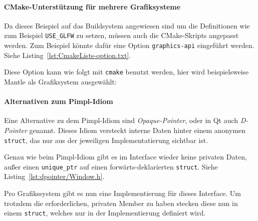 \documentclass[12pt, a4paper, titlepage, hidelinks]{scrreprt}
\begin{document}
\paragraph{CMake-Unterstützung für mehrere Grafiksysteme}
Da dieses Beispiel auf das Buildsystem angewiesen sind um die Definitionen wie zum Beispiel \texttt{USE\_GLFW} zu setzen, müssen auch die CMake-Skripts angepasst werden. Zum Beispiel könnte dafür eine Option \texttt{graphics-api} eingeführt werden. Siehe Listing~\autoref{lst:CmakeLists-option.txt}.


Diese Option kann wie folgt mit \texttt{cmake} benutzt werden, hier wird beispielsweise Mantle als Grafiksystem ausgewählt:

\paragraph{Alternativen zum Pimpl-Idiom}
Eine Alternative zu dem Pimpl-Idiom sind \textit{Opaque-Pointer}, oder in Qt auch \textit{D-Pointer} genannt. Dieses Idiom versteckt interne Daten hinter einem anonymen \texttt{struct}, das nur aus der jeweiligen Implementatierung sichtbar ist. 

Genau wie beim Pimpl-Idiom gibt es im Interface wieder keine privaten Daten, außer einen \texttt{unique\_ptr} auf einen forwärts-deklarierten \texttt{struct}.  Siehe Listing~\autoref{lst:dpointer/Window.h}.


Pro Grafikssystem gibt es nun eine Implementierung für dieses Interface. Um trotzdem die erforderlichen, privaten Member zu haben stecken diese nun in einem \texttt{struct}, welches nur in der Implementierung definiert wird.

\end{document}
